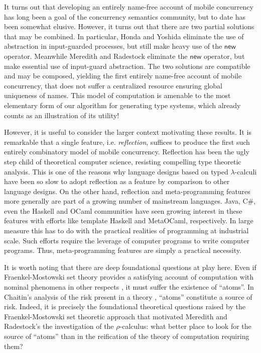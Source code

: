 \documentclass[submission,copyright,creativecommons]{eptcs}
\newcommand{\rhoc}{$\rho$-calculus}
\theoremstyle{definition}
\theoremstyle{remark}
\theoremstyle{remark}
\begin{document}
It turns out that developing an entirely name-free account of mobile
concurrency has long been a goal of the concurrency semantics
community, but to date has been somewhat elusive. However, it turns
out that there are two partial solutions that may be combined. In
particular, Honda and Yoshida eliminate the use of abstraction in
input-guarded processes, but still make heavy use of the
$\mathsf{new}$ operator. Meanwhile Meredith and Radestock
\cite{DBLP:journals/entcs/MeredithR05} eliminate the $\mathsf{new}$
operator, but make essential use of input-guard abstraction. The two
solutions are compatible and may be composed, yielding the first
entirely name-free account of mobile concurrency, that does not suffer
a centralized resource ensuring global uniqueness of names. This model
of computation is amenable to the most elementary form of our
algorithm for generating type systems, which already counts as an
illustration of its utility!

However, it is useful to consider the larger context motivating these
results. It is remarkable that a single feature, i.e. \emph{reflection}, suffices
to produce the first such entirely combinatory model of mobile
concurrency. Reflection has been the ugly step child of theoretical
computer science, resisting compelling type theoretic analysis. This
is one of the reasons why language designs based on typed
$\lambda$-calculi have been so slow to adopt reflection as a feature
by comparison to other language designs. On the other hand, reflection
and meta-programming features more generally are part of a growing
number of mainstream languages. Java, C\#, even the Haskell and OCaml
communities have seen growing interest in these features with efforts
like template Haskell and MetaOCaml, respectively. In large measure
this has to do with the practical realities of programming at
industrial scale. Such efforts require the leverage of computer
programs to write computer programs. Thus, meta-programming features
are simply a practical necessity.

It is worth noting that there are deep foundational questions at play
here. Even if Fraenkel-Mostowski set theory provides a satisfying
account of computation with nominal phenomena in other respects
\cite{DBLP:journals/fac/GabbayP02}, it must suffer the existence of
``atoms''. In Chaitin's analysis of the risk present in a theory
\cite{chaitin1999unknowable}, ``atoms'' constitute a source of
risk. Indeed, it is precisely the foundational theoretical questions
raised by the Fraenkel-Mostowski set theoretic approach that motivated
Meredith and Radestock's the investigation of the {\rhoc}: what better
place to look for the source of ``atoms'' than in the reification of
the theory of computation requiring them?
\end{document}

